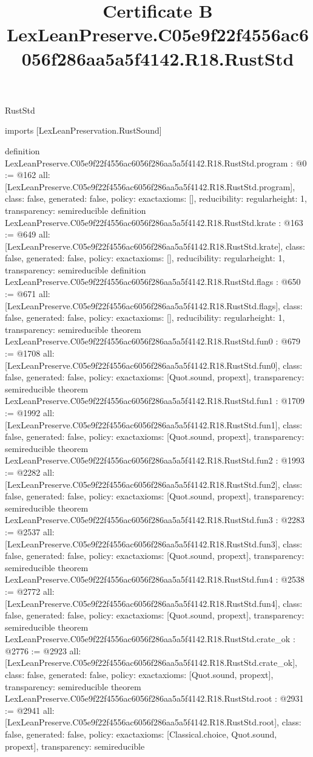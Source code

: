 \begin{lexlean}{RustStd}
\title{Certificate B LexLeanPreserve.C05e9f22f4556ac6056f286aa5a5f4142.R18.RustStd}
\begin{coremodule}
imports [LexLeanPreservation.RustSound]

definition LexLeanPreserve.C05e9f22f4556ac6056f286aa5a5f4142.R18.RustStd.program : @0 := @162 {
  all: [LexLeanPreserve.C05e9f22f4556ac6056f286aa5a5f4142.R18.RustStd.program],
  class: false,
  generated: false,
  policy: exact{axioms: []},
  reducibility: regular{height: 1},
  transparency: semireducible
}
definition LexLeanPreserve.C05e9f22f4556ac6056f286aa5a5f4142.R18.RustStd.krate : @163 := @649 {
  all: [LexLeanPreserve.C05e9f22f4556ac6056f286aa5a5f4142.R18.RustStd.krate],
  class: false,
  generated: false,
  policy: exact{axioms: []},
  reducibility: regular{height: 1},
  transparency: semireducible
}
definition LexLeanPreserve.C05e9f22f4556ac6056f286aa5a5f4142.R18.RustStd.flags : @650 := @671 {
  all: [LexLeanPreserve.C05e9f22f4556ac6056f286aa5a5f4142.R18.RustStd.flags],
  class: false,
  generated: false,
  policy: exact{axioms: []},
  reducibility: regular{height: 1},
  transparency: semireducible
}
theorem LexLeanPreserve.C05e9f22f4556ac6056f286aa5a5f4142.R18.RustStd.fun0 : @679 := @1708 {
  all: [LexLeanPreserve.C05e9f22f4556ac6056f286aa5a5f4142.R18.RustStd.fun0],
  class: false,
  generated: false,
  policy: exact{axioms: [Quot.sound, propext]},
  transparency: semireducible
}
theorem LexLeanPreserve.C05e9f22f4556ac6056f286aa5a5f4142.R18.RustStd.fun1 : @1709 := @1992 {
  all: [LexLeanPreserve.C05e9f22f4556ac6056f286aa5a5f4142.R18.RustStd.fun1],
  class: false,
  generated: false,
  policy: exact{axioms: [Quot.sound, propext]},
  transparency: semireducible
}
theorem LexLeanPreserve.C05e9f22f4556ac6056f286aa5a5f4142.R18.RustStd.fun2 : @1993 := @2282 {
  all: [LexLeanPreserve.C05e9f22f4556ac6056f286aa5a5f4142.R18.RustStd.fun2],
  class: false,
  generated: false,
  policy: exact{axioms: [Quot.sound, propext]},
  transparency: semireducible
}
theorem LexLeanPreserve.C05e9f22f4556ac6056f286aa5a5f4142.R18.RustStd.fun3 : @2283 := @2537 {
  all: [LexLeanPreserve.C05e9f22f4556ac6056f286aa5a5f4142.R18.RustStd.fun3],
  class: false,
  generated: false,
  policy: exact{axioms: [Quot.sound, propext]},
  transparency: semireducible
}
theorem LexLeanPreserve.C05e9f22f4556ac6056f286aa5a5f4142.R18.RustStd.fun4 : @2538 := @2772 {
  all: [LexLeanPreserve.C05e9f22f4556ac6056f286aa5a5f4142.R18.RustStd.fun4],
  class: false,
  generated: false,
  policy: exact{axioms: [Quot.sound, propext]},
  transparency: semireducible
}
theorem LexLeanPreserve.C05e9f22f4556ac6056f286aa5a5f4142.R18.RustStd.crate_ok : @2776 := @2923 {
  all: [LexLeanPreserve.C05e9f22f4556ac6056f286aa5a5f4142.R18.RustStd.crate_ok],
  class: false,
  generated: false,
  policy: exact{axioms: [Quot.sound, propext]},
  transparency: semireducible
}
theorem LexLeanPreserve.C05e9f22f4556ac6056f286aa5a5f4142.R18.RustStd.root : @2931 := @2941 {
  all: [LexLeanPreserve.C05e9f22f4556ac6056f286aa5a5f4142.R18.RustStd.root],
  class: false,
  generated: false,
  policy: exact{axioms: [Classical.choice, Quot.sound, propext]},
  transparency: semireducible
}


\end{coremodule}
\end{lexlean}
